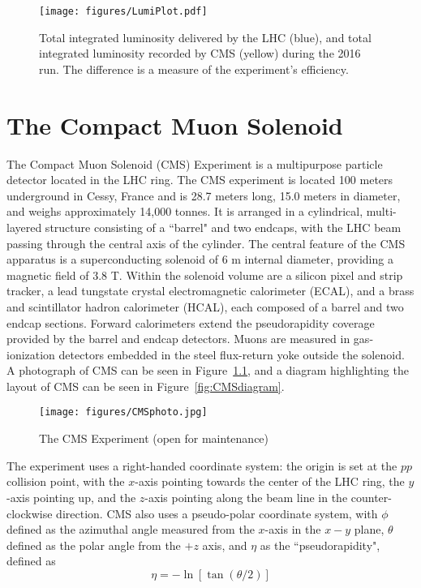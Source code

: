 \begin{figure}\centering
  \texttt{[image: figures/LumiPlot.pdf]}
  \caption{\label{fig:LumiPlot} Total integrated luminosity delivered by the LHC (blue), and total integrated luminosity recorded by CMS (yellow) during the 2016 run. The difference is a measure of the experiment's efficiency.}
\end{figure}


\chapter{The Compact Muon Solenoid}

The Compact Muon Solenoid (CMS) Experiment is a multipurpose particle detector located in the LHC ring. The CMS experiment is located 100 meters underground in Cessy, France and is 28.7 meters long, 15.0 meters in diameter, and weighs approximately 14,000 tonnes. It is arranged in a cylindrical, multi-layered structure consisting of a ``barrel" and two endcaps, with the LHC beam passing through the central axis of the cylinder. The central feature of the CMS apparatus is a superconducting solenoid of 6 m internal diameter, providing a magnetic field of 3.8 T. Within the solenoid volume are a silicon pixel and strip tracker, a lead tungstate crystal electromagnetic calorimeter (ECAL), and a brass and scintillator hadron calorimeter (HCAL), each composed of a barrel and two endcap sections. Forward calorimeters extend the pseudorapidity coverage provided by the barrel and endcap detectors. Muons are measured in gas-ionization detectors embedded in the steel flux-return yoke outside the solenoid. A photograph of CMS can be seen in Figure~\ref{fig:CMSphoto}, and a diagram highlighting the layout of CMS can be seen in Figure~\ref{fig:CMSdiagram}.
\begin{figure}\centering
  \texttt{[image: figures/CMSphoto.jpg]}
  \caption{\label{fig:CMSphoto} The CMS Experiment (open for maintenance)}
\end{figure}
The experiment uses a right-handed coordinate system: the origin is set at the $pp$ collision point, with the $x$-axis pointing towards the center of the LHC ring, the $y$-axis pointing up, and the $z$-axis pointing along the beam line in the counter-clockwise direction. CMS also uses a pseudo-polar coordinate system, with $\phi$ defined as the azimuthal angle measured from the $x$-axis in the $x-y$ plane, $\theta$ defined as the polar angle from the $+z$ axis, and $\eta$ as the ``pseudorapidity", defined as 
\begin{equation}
 \eta = -\ln\left[\tan\left(\theta/2\right)\right]
 \end{equation}

